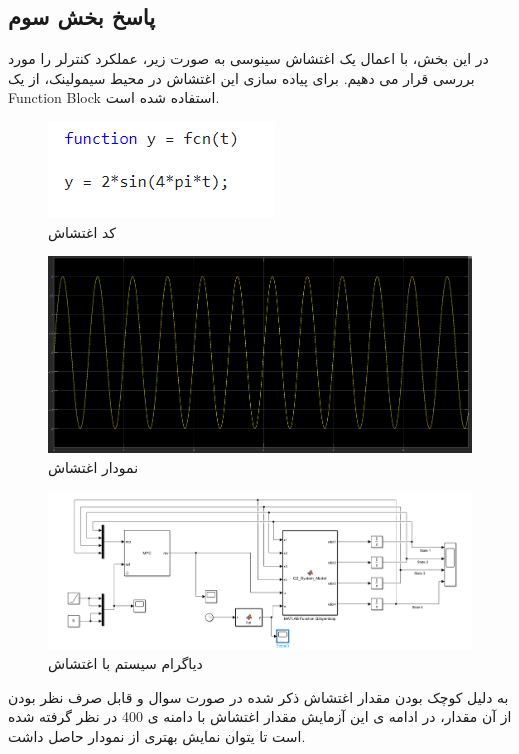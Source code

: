 \subsection*{پاسخ بخش سوم}
در این بخش، با اعمال یک اغتشاش سینوسی به صورت زیر، عملکرد کنترلر را مورد بررسی قرار می دهیم. برای پیاده سازی این اغتشاش در محیط سیمولینک، از یک Function Block استفاده شده است.
\begin{figure}[H]
	\centering
	\includegraphics[width=0.7\linewidth]{../img/Q3_Disturbance}
	\caption{کد اغتشاش}
	\label{fig:q3disturbance}
\end{figure}
\begin{figure}[H]
	\centering
	\includegraphics[width=0.7\linewidth]{../img/Q3_Disturbance_plot}
	\caption{نمودار اغتشاش}
	\label{fig:q3disturbanceplot}
\end{figure}
\begin{figure}[H]
	\centering
	\includegraphics[width=1\linewidth]{../img/Q3_Diagram}
	\caption{دیاگرام سیستم با اغتشاش}
	\label{fig:q3diagram}
\end{figure}
به دلیل کوچک بودن مقدار اغتشاش ذکر شده در صورت سوال و قابل صرف نظر بودن از آن مقدار، در ادامه ی این آزمایش مقدار اغتشاش با دامنه ی 400 در نظر گرفته شده است تا یتوان نمایش بهتری از نمودار حاصل داشت.
